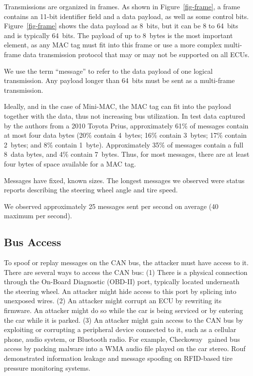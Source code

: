 Transmissions are organized in frames.  As shown in Figure~\ref{fig-frame}, 
a frame contains an 11-bit identifier field and 
a data payload, as well as some control bits. Figure~\ref{fig-frame} shows the data payload as 8~bits, but
it can be 8 to 64~bits and is typically 64~bits.
The payload of up to 8~bytes is the most important element, 
as any MAC tag must fit into this frame or use a more complex multi-frame data transmission protocol 
that may or may not be supported on all ECUs. 

We use the term ``message'' to refer to the data payload of one logical transmission.
Any payload longer than 64~bits must be sent as a multi-frame transmission.

Ideally, and in the case of Mini-MAC, the MAC tag
can fit into the payload together with the data, thus not increasing bus utilization. 
In test data captured by the authors from a 2010 Toyota Prius, 
approximately 61\% of messages contain at most four data bytes
(20\% contain 4~bytes; 16\% contain 3~bytes; 17\% contain 2~bytes; and 8\% contain 1~byte).
Approximately 35\% of messages contain a full 8~data bytes, and 4\% contain 7~bytes.
Thus, for most messages, there are at least four bytes of space available for a MAC tag.

Messages have fixed, known sizes.  The longest messages we observed were 
status reports describing the steering wheel angle and tire speed.

We observed approximately 25 messages sent per second on average (40 maximum per second).

\subsection{Bus Access}
\label{access}

To spoof or replay messages on the CAN bus, the attacker must have access to it.
There are several ways to access the CAN bus:  (1) There is a
physical connection through the On-Board Diagnostic (OBD-II) port, 
typically located underneath the steering wheel.  An attacker might hide
access to this port by splicing into unexposed wires.
(2) An attacker might corrupt an ECU by rewriting its firmware. An attacker might
do so while the car is being serviced or by entering the car while it is parked.
(3) An attacker might gain access to the CAN bus by exploiting or corrupting a peripheral
device connected to it, such as a cellular phone, audio system, or Bluetooth
radio.  For example, Checkoway~\cite{Checkoway-2011} gained bus access by packing 
malware into a WMA audio file played on the car stereo. 
Rouf~\cite{Rouf2010} demonstrated information leakage and message spoofing on RFID-based tire pressure monitoring systems.

